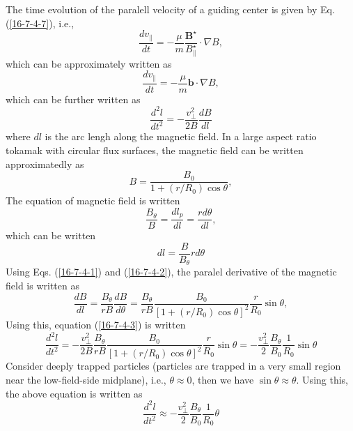 \documentclass{article}
\begin{document}
The time evolution of the paralell velocity of a guiding center is given by
Eq. (\ref{16-7-4-7}), i.e.,
\begin{equation}
  \frac{d v_{\parallel}}{d t} = - \frac{\mu}{m} 
  \frac{\mathbf{B}^{\star}}{B^{\star}_{\parallel}} \cdot \nabla B,
\end{equation}
which can be approximately written as
\[ \frac{d v_{\parallel}}{d t} = - \frac{\mu}{m} \mathbf{b} \cdot \nabla B, \]
which can be further written as
\begin{equation}
  \label{16-7-4-3} \frac{d^2 l}{d t^2} = - \frac{v_{\perp}^2}{2 B} \frac{d
  B}{d l}
\end{equation}
where $d l$ is the arc lengh along the magnetic field. In a large aspect ratio
tokamak with circular flux surfaces, the magnetic field can be written
approximatedly as
\begin{equation}
  \label{16-7-4-2} B = \frac{B_0}{1 + (r / R_0) \cos \theta},
\end{equation}
The equation of magnetic field is written
\begin{equation}
  \frac{B_{\theta}}{B} = \frac{d l_p}{d l} = \frac{r d \theta}{d l},
\end{equation}
which can be written
\begin{equation}
  \label{16-7-4-1} d l = \frac{B}{B_{\theta}} r d \theta
\end{equation}
Using Eqs. (\ref{16-7-4-1}) and (\ref{16-7-4-2}), the paralel derivative of
the magnetic field is written as
\begin{equation}
  \frac{d B}{d l} = \frac{B_{\theta}}{r B}  \frac{d B}{d \theta} =
  \frac{B_{\theta}}{r B}  \frac{B_0}{[1 + (r / R_0) \cos \theta]^2} 
  \frac{r}{R_0} \sin \theta,
\end{equation}
Using this, equation (\ref{16-7-4-3}) is written
\begin{equation}
  \frac{d^2 l}{d t^2} = - \frac{v_{\perp}^2}{2 B} \frac{B_{\theta}}{r B} 
  \frac{B_0}{[1 + (r / R_0) \cos \theta]^2}  \frac{r}{R_0} \sin \theta = -
  \frac{v_{\perp}^2}{2}  \frac{B_{\theta}}{B_0}  \frac{1}{R_0} \sin \theta
\end{equation}
Consider deeply trapped particles (particles are trapped in a very small
region near the low-field-side midplane), i.e., $\theta \approx 0$, then we
have $\sin \theta \approx \theta$. Using this, the above equation is written
as
\begin{equation}
  \label{16-7-4-6} \frac{d^2 l}{d t^2} \approx - \frac{v_{\perp}^2}{2} 
  \frac{B_{\theta}}{B_0}  \frac{1}{R_0} \theta
\end{equation}
\end{document}
